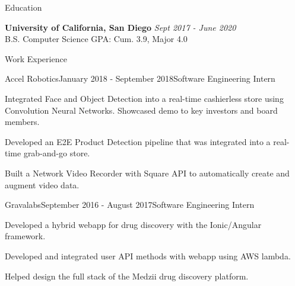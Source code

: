 \documentclass{resume} %
\begin{document}

\begin{rSection}{Education}

{\bf University of California, San Diego} \hfill {\em Sept 2017 - June 2020} 
\\ B.S. Computer Science \hfill { GPA: Cum. 3.9, Major 4.0 }
\end{rSection}


\begin{rSection}{Work Experience}

\begin{rSubsection}{Accel Robotics}{January 2018 - September 2018}{Software Engineering Intern}{}
\item Integrated Face and Object Detection into a real-time cashierless store using Convolution Neural Networks. Showcased demo to key investors and board members.
\item Developed an E2E Product Detection pipeline that was integrated into a real-time grab-and-go store.
\item Built a Network Video Recorder with Square API to automatically create and augment  video data.
\end{rSubsection}


\begin{rSubsection}{Gravalabs}{September 2016 - August 2017}{Software Engineering Intern}{}
\item Developed a hybrid webapp for drug discovery with the Ionic/Angular framework.
\item Developed and integrated user API methods with webapp using AWS lambda.
\item Helped design the full stack of the Medzii drug discovery platform.
\end{rSubsection}

\end{rSection}


\end{document}
